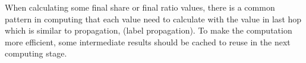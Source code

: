 
When calculating some final share or final ratio values, there is a common
pattern in computing that each value need to calculate with the value in last
hop which is similar to propagation, (\eg label propagation). To make the
computation more efficient, some intermediate results should be cached to reuse
in the next computing stage.


